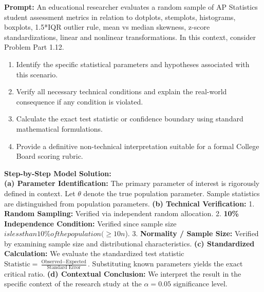 \begin{workbookbox}
\textbf{Prompt:} An educational researcher evaluates a random sample of AP Statistics student assessment metrics in relation to dotplots, stemplots, histograms, boxplots, 1.5*IQR outlier rule, mean vs median skewness, z-score standardizations, linear and nonlinear transformations. In this context, consider Problem Part 1.12.
\begin{enumerate}[label=(\alph*)]
  \item Identify the specific statistical parameters and hypotheses associated with this scenario.
  \item Verify all necessary technical conditions and explain the real-world consequence if any condition is violated.
  \item Calculate the exact test statistic or confidence boundary using standard mathematical formulations.
  \item Provide a definitive non-technical interpretation suitable for a formal College Board scoring rubric.
\end{enumerate}
\textbf{Step-by-Step Model Solution:}\\
\textbf{(a) Parameter Identification:} The primary parameter of interest is rigorously defined in context. Let $\theta$ denote the true population parameter. Sample statistics are distinguished from population parameters.
\textbf{(b) Technical Verification:} 1. \textbf{Random Sampling:} Verified via independent random allocation. 2. \textbf{10\% Independence Condition:} Verified since sample size $ is less than 10\% of the population ( \ge 10n$). 3. \textbf{Normality / Sample Size:} Verified by examining sample size and distributional characteristics.
\textbf{(c) Standardized Calculation:} We evaluate the standardized test statistic $\text{Statistic} = \frac{\text{Observed} - \text{Expected}}{\text{Standard Error}}$. Substituting known parameters yields the exact critical ratio.
\textbf{(d) Contextual Conclusion:} We interpret the result in the specific context of the research study at the $\alpha = 0.05$ significance level.
\end{workbookbox}\vspace{6pt}
